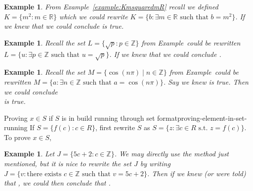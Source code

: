 \documentclass{book}
\newcounter{ekcounter}%
\theoremstyle{ekimcustom}
\newtheorem{example}[ekcounter]{Example}
\begin{document}
\begin{example}
From Example~\ref{example:KmsquaredmR} recall we defined $K = \{ m^2 : m \in \mathbb{R}\}$
which we could rewrite $K = \{ b : \exists m \in \mathbb{R} \text{ such that } b = m^2\}$.
If we knew that  we could conclude  is true.
\end{example}
\begin{example}
Recall the set $L = \{ \sqrt{p} : p \in \mathbb{Z}\}$ from Example~\label{example:Lsqrtp-with-pinZ}
could be rewritten $L = \{u : \exists p \in \mathbb{Z} \text{ such that } u = \sqrt{p}\}$.
If we knew that  we could conclude .
\end{example}
\begin{example}
Recall the set $M = \{ \cos(n\pi) \mid n \in \mathbb{Z}\}$ from Example~\label{example:Mcosnpi}
could be rewritten $M = \{ a : \exists n \in \mathbb{Z} \text{ such that } a = \cos(n\pi)\}$.
Say we knew  is true. Then we could conclude\\  is true.
\end{example}


\begin{bmethod}{Proving $x \in S$ if $S$ is in build running through set format}{proving-element-in-set-running}
If $S = \{f(c) : c \in R \}$, first rewrite $S$ as $S = \{z : \exists c \in R \text{ s.t. } z=f(c)\}$. To prove $x \in S$,
\begin{center}
\end{center}
\end{bmethod}
\begin{example}
Let $J = \{ 5c + 2 : c \in \mathbb{Z}\}$. We may directly use the method just mentioned, but it is nice to rewrite the set $J$ by writing $J = \{ v : \text{there exists } c \in \mathbb{Z} \text{ such that } v=5c+2\}$. Then if we knew (or were told) that , we could then conclude that .
\end{example}
\end{document}
